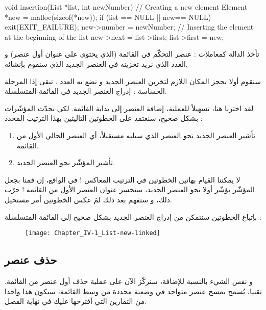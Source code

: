 \begin{Csource}
void insertion(List *list, int newNumber)
{
	// Creating a new element
	Element *new = malloc(sizeof(*new));
	if (list == NULL || new== NULL)
	{
		exit(EXIT_FAILURE);
	}
	new->number = newNumber;	
	// Inserting the element at the beginning of the list
	new->next = list->first;
	list->first = new;
}
\end{Csource}

تأخذ الدالة
كمعاملات : عنصر التحكّم في القائمة (الذي يحتوي على عنوان أول عنصر) و العدد الذي نريد تخزينه في العنصر الجديد الذي سنقوم بإنشائه. 

سنقوم أولا بحجز المكان اللازم لتخزين العنصر الجديد و نضع به العدد
.
تبقى إذا المرحلة الحساسة : إدراج العنصر الجديد في القائمة المتسلسلة.

لقد اخترنا هنا، تسهيلاً للعملية، إضافة العنصر إلى بداية القائمة. لكي نحدّث المؤشّرات بشكل صحيح، سنعتمد على الخطوتين التاليتين بهذا الترتيب المحدد :

\begin{enumerate}
	\item تأشير العنصر الجديد نحو العنصر الذي سيليه مستقبلاً، أي العنصر الحالي الأول من القائمة.
	\item تأشير المؤشّر
	نحو العنصر الجديد.
\end{enumerate}

\begin{warning}
لا يمكننا القيام بهاتين الخطوتين في الترتيب المعاكس ! في الواقع، إن قمنا بجعل المؤشّر
يؤشّر أولا نحو العنصر الجديد، سنخسر عنوان العنصر الأول من القائمة ! جرّب ذلك، و ستفهم بعد ذلك لمَ عكس الخطوتين أمر مستحيل.
\end{warning}

بإتباع الخطوتين سنتمكن من إدراج العنصر الجديد بشكل صحيح إلى القائمة المتسلسلة :

\begin{figure}[H]
	\centering
	\texttt{[image: Chapter\_IV-1\_List-new-linked]}
\end{figure}

\subsection{حذف عنصر}

و نفس الشيء بالنسبة للإضافة، سنركّز الآن على عملية حذف أول عنصر من القائمة. تقنيا، يُسمح بمسح عنصر متواجد في وضعية محددة من وسط القائمة، سيكون هذا واحدا من التمارين التي أقترحها عليك في نهاية الفصل.

